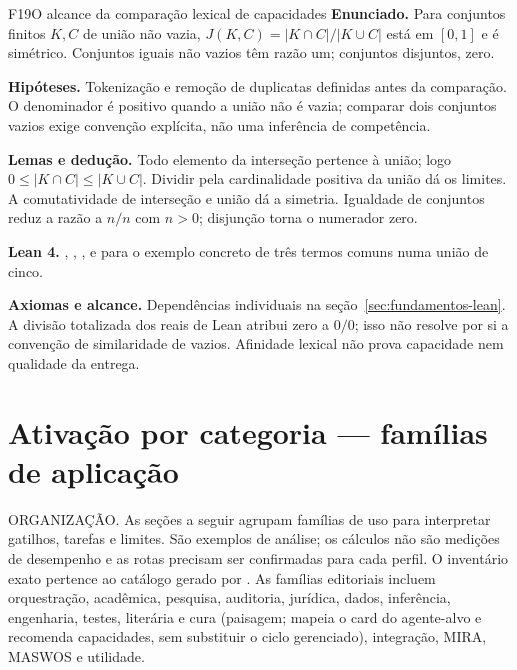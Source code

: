 \begin{formalizacao}{F19}{O alcance da comparação lexical de capacidades}
\textbf{Enunciado.} Para conjuntos finitos $K,C$ de união não vazia,
$J(K,C)=|K\cap C|/|K\cup C|$ está em $[0,1]$ e é simétrico.
Conjuntos iguais não vazios têm razão um; conjuntos disjuntos, zero.

\textbf{Hipóteses.} Tokenização e remoção de duplicatas definidas antes da
comparação. O denominador é positivo quando a união não é vazia; comparar
dois conjuntos vazios exige convenção explícita, não uma inferência de
competência.

\textbf{Lemas e dedução.} Todo elemento da interseção pertence à união;
logo $0\leq|K\cap C|\leq|K\cup C|$. Dividir pela cardinalidade positiva
da união dá os limites. A comutatividade de interseção e união dá a
simetria. Igualdade de conjuntos reduz a razão a $n/n$ com $n>0$;
disjunção torna o numerador zero.

\textbf{Lean 4.} ,
,
,
 e
 para o exemplo
concreto de três termos comuns numa união de cinco.

\textbf{Axiomas e alcance.} Dependências individuais na
seção~\ref{sec:fundamentos-lean}. A divisão totalizada dos reais de Lean
atribui zero a $0/0$; isso não resolve por si a convenção de similaridade
de vazios. Afinidade lexical não prova capacidade nem qualidade da entrega.
\end{formalizacao}

\section{Ativação por categoria — famílias de aplicação}

\begin{descricao}
ORGANIZAÇÃO. As seções a seguir agrupam famílias de uso para interpretar
gatilhos, tarefas e limites. São exemplos de análise; os cálculos não são
medições de desempenho e as rotas precisam ser confirmadas para cada perfil.
O inventário exato pertence ao catálogo gerado por .
As famílias editoriais incluem orquestração, acadêmica, pesquisa, auditoria, jurídica,
dados, inferência, engenharia, testes, literária e cura (paisagem; mapeia o
card do agente-alvo e recomenda capacidades, sem substituir o ciclo gerenciado),
integração, MIRA, MASWOS e utilidade.
\end{descricao}

